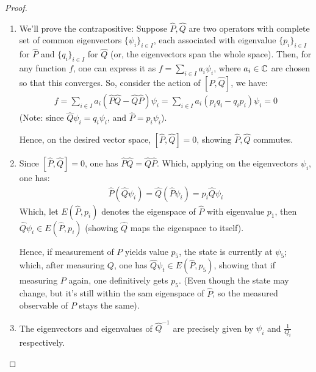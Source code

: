 \documentclass{article}
\begin{document}
\begin{proof}
    
    \hfil

    \begin{enumerate}
        \item We'll prove the contrapositive: Suppose $\hat{P},\hat{Q}$ are two operators with complete set of common eigenvectors $\{\psi_i\}_{i\in I}$, each associated with eigenvalue $\{p_i\}_{i\in I}$ for $\hat{P}$ and $\{q_i\}_{i\in I}$ for $\hat{Q}$ (or, the eigenvectors span the whole space). Then, for any function $f$, one can express it as $f=\sum_{i \in I}a_i\psi_i$, where $a_i\in\mathbb{C}$ are chosen so that this converges. So, consider the action of $[\hat{P},\hat{Q}]$, we have:
        \begin{align}
            [\hat{P},\hat{Q}]f = \sum_{i\in I}a_i(\hat{P}\hat{Q}-\hat{Q}\hat{P})\psi_i = \sum_{i\in I}a_i(p_i q_i-q_i p_i)\psi_i=0
        \end{align}
        (Note: since $\hat{Q}\psi_i = q_i\psi_i$, and $\hat{P}=p_i\psi_i$).

        Hence, on the desired vector space, $[\hat{P},\hat{Q}]=0$, showing $\hat{P},\hat{Q}$ commutes.

        \hfil

        \item Since $[\hat{P},\hat{Q}]=0$, one has $\hat{P}\hat{Q}=\hat{Q}\hat{P}$. Which, applying on the eigenvectors $\psi_i$, one has:
        \begin{align}
            \hat{P}(\hat{Q}\psi_i) = \hat{Q}(\hat{P}\psi_i) = p_i \hat{Q}\psi_i
        \end{align}
        Which, let $E(\hat{P},p_i)$ denotes the eigenspace of $\hat{P}$ with eigenvalue $p_1$, then $\hat{Q}\psi_i \in E(\hat{P},p_i)$ (showing $\hat{Q}$ maps the eigenspace to itself). 

        Hence, if measurement of $P$ yields value $p_5$, the state is currently at $\psi_5$; which, after measuring $Q$, one has $\hat{Q}\psi_t\in E(\hat{P},p_5)$, showing that if measuring $P$ again, one definitively gets $p_5$. (Even though the state may change, but it's still within the sam eigenspace of $\hat{P}$, so the measured observable of $P$ stays the same).

        \hfil

        \item The eigenvectors and eigenvalues of $\hat{Q}^{-1}$ are precisely given by $\psi_i$ and $\frac{1}{Q_i}$ respectively. 
        

\end{enumerate}
\end{proof}
\end{document}
